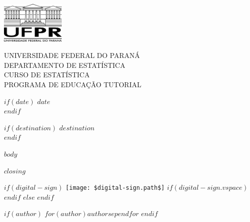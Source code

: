 \documentclass[a4paper, 11pt]{letter}
\begin{document}
\pagestyle{empty}

\noindent
\begin{minipage}[c]{0.2\textwidth}
    \includegraphics[height=2cm]{../prova-ufpr/ufpr_logo.png}
\end{minipage}
\begin{minipage}[c]{0.75\textwidth}
  \baselineskip 12pt
  UNIVERSIDADE FEDERAL DO PARANÁ\\
  DEPARTAMENTO DE ESTATÍSTICA\\
  CURSO DE ESTATÍSTICA\\
  PROGRAMA DE EDUCAÇÃO TUTORIAL
\end{minipage}

\vspace{2cm}

$if(date)$
  \noindent $date$\\
  \vspace{1cm}
$endif$

$if(destination)$
  \noindent $destination$\\
  \vspace{1cm}
$endif$

  $body$

  \vspace{1cm}
  \begin{minipage}{1\textwidth}
    $closing$
  \end{minipage}
  \vspace{0.3cm}

  \noindent

    \hspace{0.5\linewidth}
    \begin{minipage}{0.49\linewidth}
      \begin{center}

        $if(digital-sign)$
          \texttt{[image: \$digital-sign.path\$]}
          $if(digital-sign.vspace)$\vspace{$digital-sign.vspace$}$endif$
        $else$
        \vspace{2cm}
        $endif$

        $if(author)$
        $for(author)$\noindent $author$$sep$\newline $endfor$
        $endif$
        \newline

      \end{center}

  \end{minipage}
\end{document}
